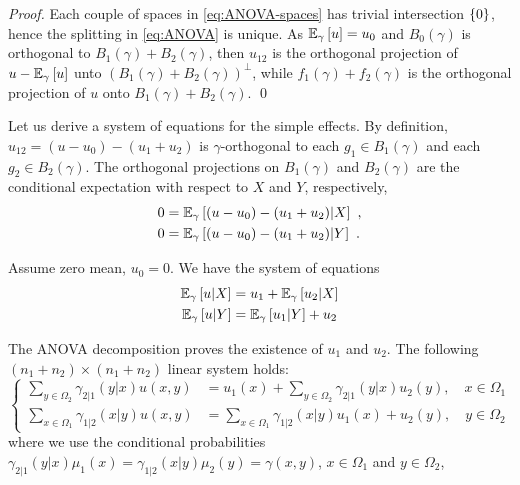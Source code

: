 \documentclass[runningheads]{llncs}
\begin{document}
\begin{proof}Each couple of spaces in \cref{eq:ANOVA-spaces} has trivial intersection $\left\{ 0 \right\}$, hence the splitting in \cref{eq:ANOVA} is unique. As ${\operatorname{\mathbb E}}_{\gamma}\left[u\right] = u_0$ and $B_0(\gamma)$ is orthogonal to $B_1(\gamma)+B_2(\gamma)$, then $u_{12}$ is the orthogonal projection of $u - {\operatorname{\mathbb E}}_{\gamma}\left[u\right]$ unto $(B_1(\gamma)+B_2(\gamma))^\perp$, while $f_1(\gamma)+f_2(\gamma)$ is the orthogonal projection of $u$ onto $B_1(\gamma)+B_2(\gamma)$. \qed
\end{proof}

Let us derive a system of equations for the simple effects. By definition, $u_{12} = (u - u_0) - (u_1 + u_2)$ is $\gamma$-orthogonal to each $g_1 \in B_1(\gamma)$ and each $g_2 \in B_2(\gamma)$. The orthogonal projections on $B_1(\gamma)$ and $B_2(\gamma)$ are the conditional expectation with respect to $X$ and $Y$, respectively,
%
  \begin{align*}
    0 &= {\operatorname{\mathbb E}}_{\gamma}\left[(u-u_0) - (u_1+u_2) \middle| X\right]  \ , \\
   0 &= {\operatorname{\mathbb E}}_{\gamma}\left[(u-u_0) - (u_1+u_2) \middle| Y\right] \ .
  \end{align*}

Assume zero mean, $u_0=0$. We have the system of equations
\begin{align*}
  {\operatorname{\mathbb E}}_{\gamma}\left[u \middle| X\right] &=  u_1 + {\operatorname{\mathbb E}}_{\gamma}\left[u_2 \middle| X\right] \\
  {\operatorname{\mathbb E}}_{\gamma}\left[u \middle| Y\right] &= {\operatorname{\mathbb E}}_{\gamma}\left[u_1 \middle| Y\right] + u_2
\end{align*}

The ANOVA decomposition proves the existence of $u_1$ and $u_2$.  The following $(n_1+n_2)\times(n_1+n_2)$ linear system holds:
\begin{equation*}
\begin{cases}
  \sum_{y \in \Omega_2} \gamma_{2|1}(y|x)u(x,y) &= u_1(x) + \sum_{y \in \Omega_2} \gamma_{2|1}(y|x) u_2(y) , \quad x \in \Omega_1 \\
  \sum_{x \in \Omega_1} \gamma_{1|2}(x|y)u(x,y) &= \sum_{x \in \Omega_1} \gamma_{1|2}(x|y) u_1(x)  + u_2(y) , \quad y \in \Omega_2
\end{cases}
\end{equation*}
where we use the conditional probabilities $\gamma_{2|1}(y|x) \mu_1(x) = \gamma_{1|2}(x|y) \mu_2(y) = \gamma(x,y)$, $x \in \Omega_1$ and $y \in \Omega_2$,
\end{document}
